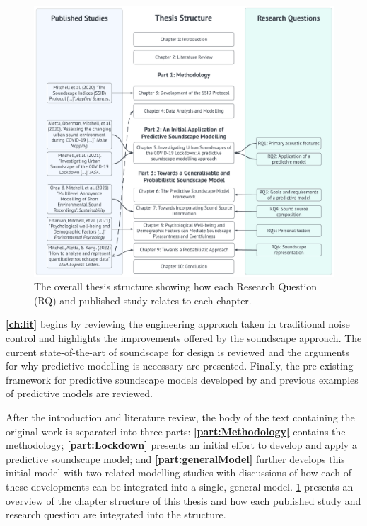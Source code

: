 \begin{figure}
  \centering
  \includegraphics[width=\textwidth]{Figures/Thesis Structure 2022-05-24.png}
  \caption{The overall thesis structure showing how each Research Question (RQ) and published study relates to each chapter. \label{fig:thesisStructure}}
\end{figure}

\textbf{\cref{ch:lit}} begins by reviewing the engineering approach taken in traditional noise control and highlights the improvements offered by the soundscape approach. The current state-of-the-art of soundscape for design is reviewed and the arguments for why predictive modelling is necessary are presented. Finally, the pre-existing framework for predictive soundscape models developed by \citet{Aletta2016Soundscape} and previous examples of predictive models are reviewed. 

After the introduction and literature review, the body of the text containing the original work is separated into three parts: \textbf{\cref{part:Methodology}} contains the methodology; \textbf{\cref{part:Lockdown}} presents an initial effort to develop and apply a predictive soundscape model; and \textbf{\cref{part:generalModel}} further develops this initial model with two related modelling studies with discussions of how each of these developments can be integrated into a single, general model. \cref{fig:thesisStructure} presents an overview of the chapter structure of this thesis and how each published study and research question are integrated into the structure.


